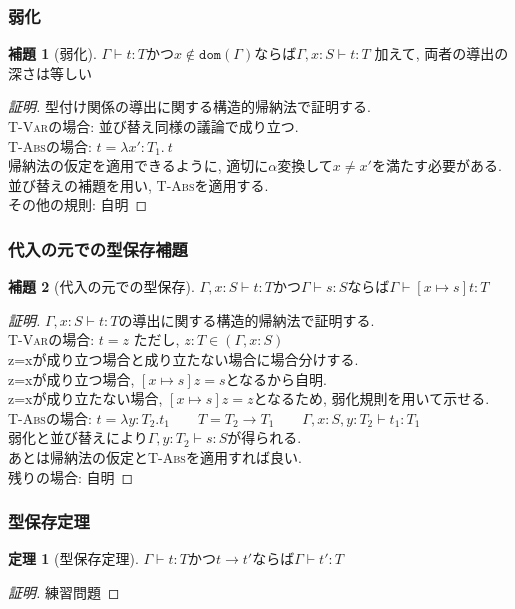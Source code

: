 \documentclass[dvipdfmx,cjk,xcolor=dvipsnames,envcountsect,notheorems,aspectratio=169]{beamer}
\theoremstyle{definition}
\newtheorem{theorem}{定理}
\newtheorem{lemma}{補題}
\begin{document}
\begin{frame}
  \frametitle{弱化}
  \renewcommand{\thelemma}{9.3.7}
  \begin{lemma}[弱化]
		$\Gamma \vdash t : T$かつ$x\notin \texttt{dom}(\Gamma)$ならば$\Gamma, x:S\vdash t : T$
		加えて, 両者の導出の深さは等しい
  \end{lemma}
  \begin{proof}[証明]
		型付け関係の導出に関する構造的帰納法で証明する.\\
		\textsc{T-Var}の場合: 並び替え同様の議論で成り立つ.\\
		\textsc{T-Abs}の場合: $t=\lambda x':T_1.~t$\\
		帰納法の仮定を適用できるように, 適切に$\alpha$変換して$x\neq x'$を満たす必要がある.\\
		並び替えの補題を用い, \textsc{T-Abs}を適用する.\\
		その他の規則: 自明
  \end{proof}
\end{frame}

\begin{frame}
  \frametitle{代入の元での型保存補題}
  \renewcommand{\thelemma}{9.3.8}
  \begin{lemma}[代入の元での型保存]
		$\Gamma, x:S \vdash t : T$かつ$\Gamma \vdash s:S$ならば$\Gamma \vdash [x \mapsto s]t : T$
  \end{lemma}
  \begin{proof}[証明]
		$\Gamma, x:S \vdash t : T$の導出に関する構造的帰納法で証明する.\\
		\textsc{T-Var}の場合: $t=z$ ただし, $z:T\in (\Gamma, x:S)$\\
		z=xが成り立つ場合と成り立たない場合に場合分けする.\\
		z=xが成り立つ場合, $[x \mapsto s]z = s$となるから自明.\\
		z=xが成り立たない場合, $[x \mapsto s]z = z$となるため, 弱化規則を用いて示せる.\\
		\textsc{T-Abs}の場合: $t=\lambda y:T_2.t_1\qquad T=T_2 \to T_1\qquad \Gamma, x:S, y:T_2 \vdash t_1:T_1$\\
		弱化と並び替えにより$\Gamma, y:T_2 \vdash s : S$が得られる.\\
		あとは帰納法の仮定と\textsc{T-Abs}を適用すれば良い.\\
		残りの場合: 自明
  \end{proof}
\end{frame}

\begin{frame}
  \frametitle{型保存定理}
  \renewcommand{\thetheorem}{9.3.9}
  \begin{theorem}[型保存定理]
		$\Gamma \vdash t : T$かつ$t\longrightarrow t'$ならば$\Gamma \vdash t' : T$
  \end{theorem}
  \begin{proof}[証明]
		練習問題
  \end{proof}
\end{frame}
\end{document}
